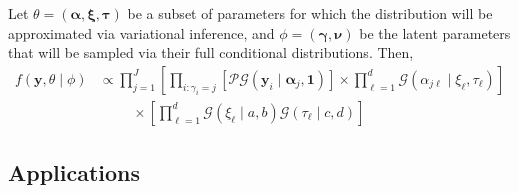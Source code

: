 Let $\theta = (\bm{\alpha},\bm{\xi},\bm{\tau})$ be a subset of parameters for which the distribution will be approximated via variational inference,
and $\phi = (\bm{\gamma},\bm{\nu})$ be the latent parameters that will be sampled via their full conditional distributions.  Then,
\begin{equation}
    \begin{aligned}
        f(\bm{y},\theta\mid\phi) &\propto \mathcal \prod_{j = 1}^J\left[\prod_{i:\gamma_i = j}\left[\mathcal{PG}(\bm{y}_i\mid\bm{\alpha}_j,\bm{1})\right]\times\prod_{\ell = 1}^d\mathcal{G}(\alpha_{j\ell}\mid\xi_{\ell},\tau_{\ell})\right] \\
        &\hspace{1cm}\times \left[\prod_{\ell = 1}^d\mathcal{G}(\xi_{\ell}\mid a, b)\mathcal{G}(\tau_{\ell}\mid c,d)\right]        
    \end{aligned}
\end{equation}

\cite{tran2021}

\subsection{Applications}



























